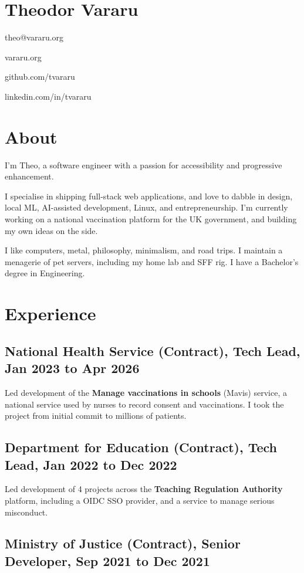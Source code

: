 \documentclass{article}
\begin{document}
\section*{Theodor Vararu}

theo@vararu.org

vararu.org

github.com/tvararu

linkedin.com/in/tvararu

\section*{About}

I'm Theo, a software engineer with a passion for accessibility and progressive
enhancement.

I specialise in shipping full-stack web applications, and love to dabble in
design, local ML, AI-assisted development, Linux, and entrepreneurship. I'm
currently working on a national vaccination platform for the UK government, and
building my own ideas on the side.

I like computers, metal, philosophy, minimalism, and road trips. I maintain a
menagerie of pet servers, including my home lab and SFF rig. I have a Bachelor's
degree in Engineering.

\section*{Experience}

\subsection*{National Health Service (Contract), Tech Lead, Jan 2023 to Apr
2026}

Led development of the \textbf{Manage vaccinations in schools} (Mavis) service,
a national service used by nurses to record consent and vaccinations. I took the
project from initial commit to millions of patients.

\subsection*{Department for Education (Contract), Tech Lead, Jan 2022 to Dec
2022}

Led development of 4 projects across the \textbf{Teaching Regulation Authority}
platform, including a OIDC SSO provider, and a service to manage serious
misconduct.

\subsection*{Ministry of Justice (Contract), Senior Developer, Sep 2021 to Dec
2021}
\end{document}
